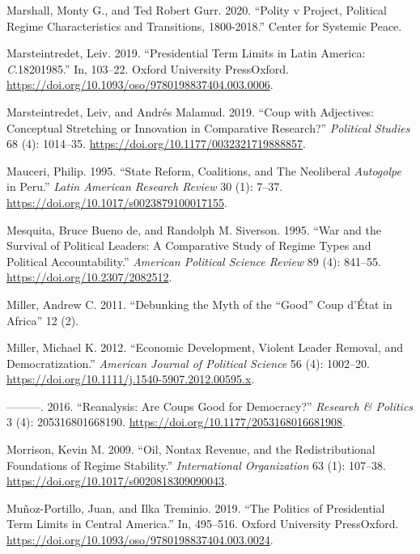 \documentclass[
  12pt,
]{report}
\newlength{\cslhangindent}
\newenvironment{CSLReferences}[2] %
 {\begin{list}{}{%
  \setlength{\itemindent}{0pt}
  \setlength{\leftmargin}{0pt}
  \setlength{\parsep}{0pt}
  \ifodd #1
   \setlength{\leftmargin}{\cslhangindent}
   \setlength{\itemindent}{-1\cslhangindent}
  \fi
  \setlength{\itemsep}{#2\baselineskip}}}
 {\end{list}}
\begin{document}
\begin{CSLReferences}{1}{0}
Marshall, Monty G., and Ted Robert Gurr. 2020. {``Polity v Project,
Political Regime Characteristics and Transitions, 1800-2018.''} Center
for Systemic Peace.

Marsteintredet, Leiv. 2019. {``Presidential Term Limits in Latin
America: {\emph{C}}.1820{\textendash}1985.''} In, 103--22. Oxford
University PressOxford.
\url{https://doi.org/10.1093/oso/9780198837404.003.0006}.

Marsteintredet, Leiv, and Andrés Malamud. 2019. {``Coup with Adjectives:
Conceptual Stretching or Innovation in Comparative Research?''}
\emph{Political Studies} 68 (4): 1014--35.
\url{https://doi.org/10.1177/0032321719888857}.

Mauceri, Philip. 1995. {``State Reform, Coalitions, and The Neoliberal
{\emph{Autogolpe}} in Peru.''} \emph{Latin American Research Review} 30
(1): 7--37. \url{https://doi.org/10.1017/s0023879100017155}.

Mesquita, Bruce Bueno de, and Randolph M. Siverson. 1995. {``War and the
Survival of Political Leaders: A Comparative Study of Regime Types and
Political Accountability.''} \emph{American Political Science Review} 89
(4): 841--55. \url{https://doi.org/10.2307/2082512}.

Miller, Andrew C. 2011. {``Debunking the Myth of the {``}Good{''} Coup
d{'}État in Africa''} 12 (2).

Miller, Michael K. 2012. {``Economic Development, Violent Leader
Removal, and Democratization.''} \emph{American Journal of Political
Science} 56 (4): 1002--20.
\url{https://doi.org/10.1111/j.1540-5907.2012.00595.x}.

---------. 2016. {``Reanalysis: Are Coups Good for Democracy?''}
\emph{Research \& Politics} 3 (4): 205316801668190.
\url{https://doi.org/10.1177/2053168016681908}.

Morrison, Kevin M. 2009. {``Oil, Nontax Revenue, and the
Redistributional Foundations of Regime Stability.''} \emph{International
Organization} 63 (1): 107--38.
\url{https://doi.org/10.1017/s0020818309090043}.

Muñoz-Portillo, Juan, and Ilka Treminio. 2019. {``The Politics of
Presidential Term Limits in Central America.''} In, 495--516. Oxford
University PressOxford.
\url{https://doi.org/10.1093/oso/9780198837404.003.0024}.


\end{CSLReferences}
\end{document}
